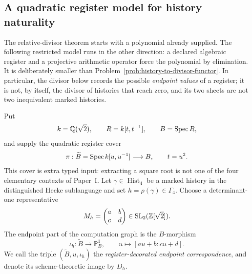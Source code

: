 \subsection{A quadratic register model for history naturality}
\label{subsec:quadratic-register-history}

The relative-divisor theorem starts with a polynomial already supplied.  The
following restricted model runs in the other direction: a declared algebraic
register and a projective arithmetic operator force the polynomial by
elimination.  It is deliberately smaller than
Problem~\ref{prob:history-to-divisor-functor}.  In particular, the divisor below
records the possible \emph{endpoint values} of a register; it is not, by itself,
the divisor of histories that reach zero, and its two sheets are not two
inequivalent marked histories.

Put
\[
 k=\mathbb{Q}(\sqrt2),\qquad R=k[t,t^{-1}],\qquad B=\operatorname{Spec} R,
\]
and supply the quadratic register cover
\begin{equation}
 \pi:\widetilde B=\operatorname{Spec} k[u,u^{-1}]\longrightarrow B,
 \qquad t=u^2.
 \label{eq:quadratic-register-cover}
\end{equation}
This cover is extra typed input: extracting a square root is not one of the four
elementary contexts of Paper~I.  Let \(\gamma\in\operatorname{Hist}_4\) be a
marked history in the distinguished Hecke sublanguage and set
\(h=\rho(\gamma)\in\Gamma_4\).  Choose a determinant-one representative
\[
 M_h=\begin{pmatrix}a&b\\c&d\end{pmatrix}
 \in\operatorname{SL}_2(\mathbb{Z}[\sqrt2]).
\]
The endpoint part of the computation graph is the \(B\)-morphism
\begin{equation}
 \iota_h:\widetilde B\longrightarrow\mathbb P^1_B,
 \qquad
 u\longmapsto[au+b:cu+d].
 \label{eq:register-endpoint-map}
\end{equation}
We call the triple \((\widetilde B,u,\iota_h)\) the
\emph{register-decorated endpoint correspondence}, and denote its
scheme-theoretic image by \(D_h\).


